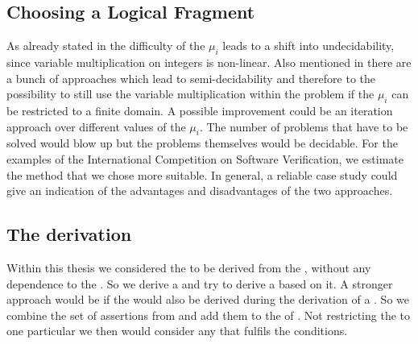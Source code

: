 \subsection{Choosing a Logical Fragment}
As already stated in  the difficulty of the $\mu_i$ leads to a shift into undecidability, since variable multiplication on integers is non-linear. Also mentioned in  there are a bunch of approaches which lead to semi-decidability and therefore to the possibility to still use the variable multiplication within the problem if the $\mu_i$ can be restricted to a finite domain.\newline
A possible improvement could be an iteration approach over different values of the $\mu_i$. The number of problems that have to be solved would blow up but the problems themselves would be decidable.\newline
For the examples of the International Competition on Software Verification, we estimate the method that we chose more suitable. In general, a reliable case study could give an indication of the advantages and disadvantages of the two approaches.

\subsection{The \stem derivation}
Within this thesis we considered the \stem to be derived from the \its, without any dependence to the \loopt. So we derive a \stem and try to derive a \gna based on it. A stronger approach would be if the \stem would also be derived during the derivation of a \gna. So we combine the set of assertions from  and add them to the \solver of . Not restricting the \gna to one particular \stem we then  would consider any \stem that fulfils the conditions. 

